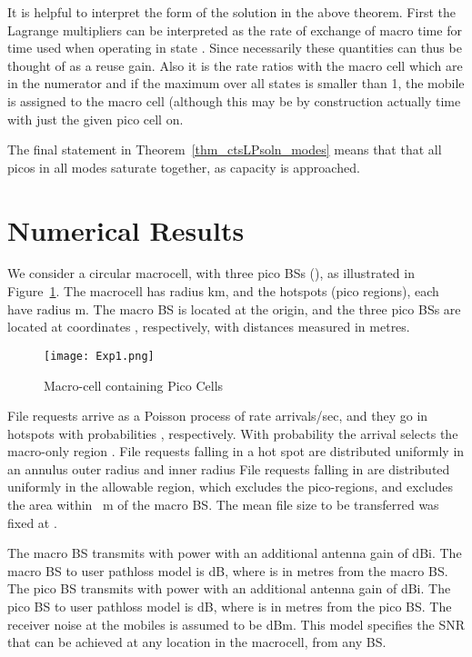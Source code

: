 \documentclass[12pt, draftcls, onecolumn]{IEEEtranTCOM}
\begin{document}
{It is helpful to interpret the form of the solution in the above theorem.  First the Lagrange multipliers  can be interpreted as the rate of exchange of macro time for time used when operating in state . Since
necessarily   these quantities can thus be thought of as a reuse gain. Also it is
the rate ratios with the macro cell which are in the numerator and if the maximum over all states is
smaller than 1, the mobile is assigned to the macro cell (although this may be by construction actually
time with just the given pico cell on.

The final statement in Theorem~\ref{thm_ctsLPsoln_modes} means that that all picos in all modes saturate together, as capacity is approached.



\section{Numerical Results}

\label{sec_numer}
We consider a circular macrocell, with three pico BSs (), as illustrated
in Figure~\ref{fig_scenario}. The macrocell has radius  km, and the hotspots (pico regions),  each have radius  m. The macro BS is located at the origin,
and the three pico BSs are located at coordinates  , respectively, with distances measured in metres.

\begin{figure}
\centering
\texttt{[image: Exp1.png]}
\caption{Macro-cell containing  Pico Cells}
\label{fig_scenario}
\end{figure}

File requests arrive as a Poisson process of rate  arrivals/sec, and they go in hotspots  with probabilities , respectively. With probability  the arrival selects the macro-only region . File requests falling in a hot spot are distributed uniformly in an
annulus outer radius  and inner radius  File requests falling in  are distributed uniformly in the allowable region, which excludes the pico-regions, and excludes the area within ~m of the macro BS. The mean file size to be transferred was fixed at
 .

The macro BS transmits with power  with an additional antenna gain of  dBi. The macro BS to user pathloss model is
 dB, where  is in metres from the macro BS. The pico BS transmits with power  with an additional antenna gain of  dBi. The pico BS to user pathloss model is  dB, where  is in metres from the pico BS.  The receiver noise at the mobiles is assumed to be  dBm. This model specifies the SNR that can be achieved at any location in the macrocell, from any BS.

}
\end{document}
